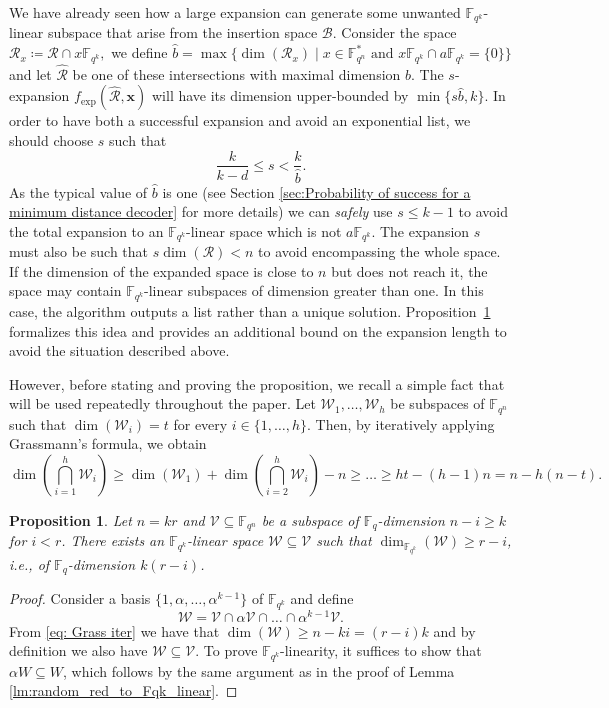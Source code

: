 \documentclass{article}
\newtheorem{proposition}{Proposition}
\newcommand{\Fq}{\mathbb{F}_{q}}
\newcommand{\Fqn}{\mathbb{F}_{q^n}}
\newcommand{\Fqk}{\mathbb{F}_{q^k}}
\newcommand{\calB}{\mathcal{B}}
\newcommand{\calR}{\mathcal{R}}
\newcommand{\calW}{\mathcal{W}}
\newcommand{\calV}{\mathcal{V}}
\newcommand{\fexp}{f_{\mathrm{exp}}}
\begin{document}
We have already seen how a large expansion can generate some unwanted $\Fqk$-linear subspace that arise from the insertion space $\calB$. 
Consider the space $\calR_x \coloneqq\calR\cap x \Fqk,$ we define $\hat{b} = \max\{ \dim(\calR_x) \mid x \in \Fqn^*\text{ and }x\Fqk\cap a\Fqk=\{0\}\}$ and let $\hat{\calR}$ be one of these intersections with maximal dimension $\hat{b}.$ The $s$-expansion $\fexp(\hat{\calR},\bm x)$ will have its dimension upper-bounded by $\min\{s\hat{b},k\}.$ 
In order to have both a successful expansion and avoid an exponential list, we should choose $s$ such that
\begin{equation}
\label{eq:ER_min_exp}
\frac{k}{k-d} \leq s < \frac{k}{\hat{b}}.
\end{equation}
As the typical value of $\hat{b}$ is one (see Section \ref{sec:Probability of success for a minimum distance decoder} for more details) we can \textit{safely} use $s \leq k-1$ to avoid the total expansion to an $\Fqk$-linear space which is not $a\Fqk$. The expansion $s$ must also be such that $s \dim(\calR) < n$ to avoid encompassing the whole space.
If the dimension of the expanded space is close to $n$ but does not reach it, the space may contain $\Fqk$-linear subspaces of dimension greater than one. In this case, the algorithm outputs a list rather than a unique solution. Proposition~\ref{prop:Fqk_minimal_space} formalizes this idea and provides an additional bound on the expansion length to avoid the situation described above. \par However, before stating and proving the proposition, we recall a simple fact that will be used repeatedly throughout the paper. Let $\calW_1,\ldots,\calW_h$ be subspaces of $\Fqn$ such that $\dim(\calW_i)=t$ for every $i\in\{1,\ldots,h\}$. Then, by iteratively applying Grassmann's formula, we obtain
\begin{equation}
    \label{eq: Grass iter}
    \dim\left(\bigcap_{i=1}^h\calW_i\right)\geq \dim(\calW_1)+\dim\left(\bigcap_{i=2}^h\calW_i\right)-n\geq \ldots\geq ht-(h-1)n=n-h(n-t). 
\end{equation}
\begin{proposition}
\label{prop:Fqk_minimal_space}
    Let $n=kr$ and $\calV \subseteq \Fqn$ be a subspace of $\Fq$-dimension $n-i\geq k$ for $i<r$.
    There exists an $\Fqk$-linear space $\calW \subseteq \calV$ such that $\dim_{\Fqk}(\calW) \geq r - i$, i.e., of $\Fq$-dimension $k(r-i)$.
\end{proposition}
\begin{proof}
Consider a basis $\{1,\alpha,\ldots,\alpha^{k-1}\}$ of $\Fqk$ and define
$$
    \calW = \calV \cap \alpha \calV \cap \ldots \cap \alpha^{k-1} \calV.
$$
From \eqref{eq: Grass iter} we have that
$\dim(\calW) \geq n - ki = (r-i)k$ and by definition we also have $\calW \subseteq \calV.$
To prove $\mathbb{F}_{q^k}$-linearity, it suffices to show that $\alpha W \subseteq W$, which follows by the same argument as in the proof of Lemma \ref{lm:random_red_to_Fqk_linear}.
\end{proof}
\end{document}
